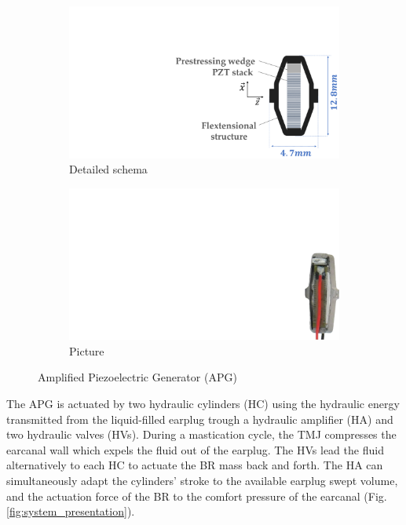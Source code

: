 \documentclass[3p,twocolumn,preprint]{elsarticle}
\def \hfillx {\hspace*{ -\linewidth} \hfill} %
\begin{document}
\begin{figure}[!htb]
	\begin{center}
		\begin{subfigure}[t]{0.5\linewidth}
			\captionsetup{justification=centering}
			\includegraphics[trim={13cm 0cm 0cm 6cm},clip,width=\linewidth]{figures/APG_schema.pdf}
			\caption{Detailed schema}
			\label{fig:APG_schema}
		\end{subfigure}
		\hfillx
		\begin{subfigure}[t]{0.21\linewidth}
			\captionsetup{justification=centering}
			\includegraphics[trim={29.5cm 0cm 0cm 8cm},clip,width=0.65\linewidth]{figures/APG_photo.pdf}
			\caption{Picture}
			\label{fig:APG_photo}
		\end{subfigure}
		\caption{Amplified Piezoelectric Generator (APG)}
		\label{fig:APG}
	\end{center}
\end{figure}

The APG is actuated by two hydraulic cylinders (HC) using the hydraulic energy transmitted from the liquid-filled earplug trough a hydraulic amplifier (HA) and two hydraulic valves (HVs). During a mastication cycle, the TMJ compresses the earcanal wall which expels the fluid out of the earplug. The HVs lead the fluid alternatively to each HC to actuate the BR mass back and forth. The HA can simultaneously adapt the cylinders' stroke to the available earplug swept volume, and the actuation force of the BR to the comfort pressure of the earcanal (Fig. \ref{fig:system_presentation}).
\end{document}
